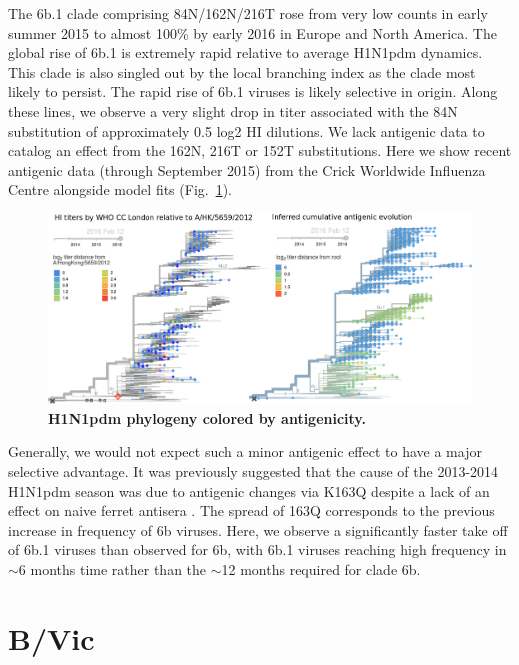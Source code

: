 \documentclass[11pt,oneside,letterpaper]{article}
\begin{document}
The 6b.1 clade comprising 84N/162N/216T rose from very low counts in early summer 2015 to almost 100\% by early 2016 in Europe and North America. The global rise of 6b.1 is extremely rapid relative to average H1N1pdm dynamics. This clade is also singled out by the local branching index \cite{neher2014predicting} as the clade most likely to persist. The rapid rise of 6b.1 viruses is likely selective in origin. Along these lines, we observe a very slight drop in titer associated with the 84N substitution of approximately 0.5 log2 HI dilutions. We lack antigenic data to catalog an effect from the 162N, 216T or 152T substitutions. Here we show recent antigenic data (through September 2015) from the Crick Worldwide Influenza Centre alongside model fits \cite{neher2015prediction} (Fig.\ \ref{H1N1pdm_HI}).

\begin{figure}[h!]
	\centering		
	\includegraphics[width=1.0\textwidth]{../figures/feb-2016/H1N1pdm_HI.png}
	\caption{\textbf{H1N1pdm phylogeny colored by antigenicity.} 
	}
	\label{H1N1pdm_HI}
\end{figure}

\pagebreak

Generally, we would not expect such a minor antigenic effect to have a major selective advantage. It was previously suggested that the cause of the 2013-2014 H1N1pdm season was due to antigenic changes via K163Q despite a lack of an effect on naive ferret antisera \cite{linderman2014potential}. The spread of 163Q corresponds to the previous increase in frequency of 6b viruses. Here, we observe a significantly faster take off of 6b.1 viruses than observed for 6b, with 6b.1 viruses reaching high frequency in $\sim$6 months time rather than the $\sim$12 months required for clade 6b.

\clearpage
\pagebreak

\section*{B/Vic}
\end{document}
